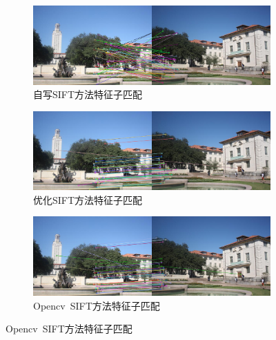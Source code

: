 \documentclass[a4paper, utf8]{ctexart}
\begin{document}
	\begin{figure}[htbp]
		\centering
		\begin{subfigure}{.8\textwidth}
			\centering
			\includegraphics[height=.13\textheight]{./figure/uttower_handon_match_sift.png}
			\caption{自写SIFT方法特征子匹配}
		\end{subfigure}
		\begin{subfigure}{.8\textwidth}
			\centering
			\includegraphics[height=.13\textheight]{./figure/uttower_handon_match_sift_opt.png}
			\caption{优化SIFT方法特征子匹配}
		\end{subfigure}
		\begin{subfigure}{.8\textwidth}
			\centering
			\includegraphics[height=.13\textheight]{./figure/uttower_opencv_match_sift.png}
			\caption{Opencv\ SIFT方法特征子匹配}
		\end{subfigure}
		

\end{figure}
\end{document}
